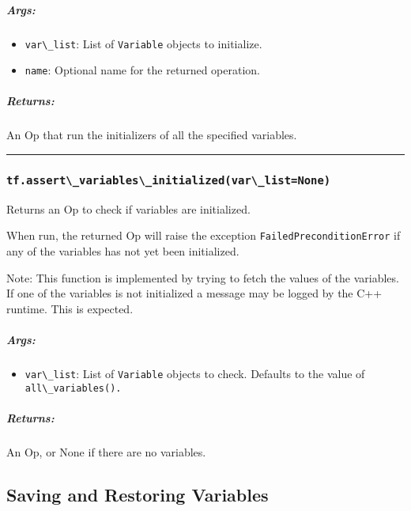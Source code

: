 \subparagraph{Args: }\label{args-7}

\begin{itemize}
\tightlist
\item
  \lstinline{var\_list}: List of \lstinline{Variable} objects to initialize.
\item
  \lstinline{name}: Optional name for the returned operation.
\end{itemize}

\subparagraph{Returns: }\label{returns-12}

An Op that run the initializers of all the specified variables.

\begin{center}\rule{0.5\linewidth}{\linethickness}\end{center}

\subsubsection{\texorpdfstring{\lstinline{tf.assert\_variables\_initialized(var\_list=None)}
}{tf.assert\_variables\_initialized(var\_list=None) }}\label{tf.assertux5fvariablesux5finitializedvarux5flistnone}

Returns an Op to check if variables are initialized.

When run, the returned Op will raise the exception
\lstinline{FailedPreconditionError} if any of the variables has not yet
been initialized.

Note: This function is implemented by trying to fetch the values of the
variables. If one of the variables is not initialized a message may be
logged by the C++ runtime. This is expected.

\subparagraph{Args: }\label{args-8}

\begin{itemize}
\tightlist
\item
  \lstinline{var\_list}: List of \lstinline{Variable} objects to check.
  Defaults to the value of \lstinline{all\_variables().}
\end{itemize}

\subparagraph{Returns: }\label{returns-13}

An Op, or None if there are no variables.

\subsection{Saving and Restoring Variables
}\label{saving-and-restoring-variables}

